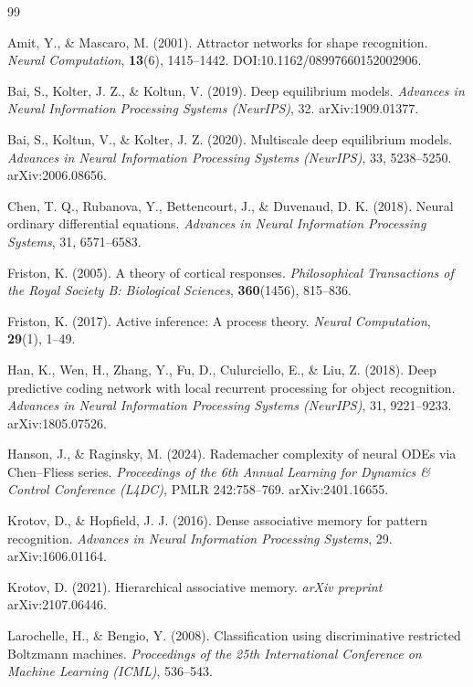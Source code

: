 \documentclass[11pt,a4paper]{article}
\begin{document}
\begin{thebibliography}{99}

Amit, Y., \& Mascaro, M. (2001).
Attractor networks for shape recognition.
\textit{Neural Computation}, \textbf{13}(6), 1415--1442.
DOI:10.1162/08997660152002906.

Bai, S., Kolter, J. Z., \& Koltun, V. (2019).
Deep equilibrium models.
\textit{Advances in Neural Information Processing Systems (NeurIPS)}, 32.
arXiv:1909.01377.

Bai, S., Koltun, V., \& Kolter, J. Z. (2020).
Multiscale deep equilibrium models.
\textit{Advances in Neural Information Processing Systems (NeurIPS)}, 33, 5238--5250.
arXiv:2006.08656.

Chen, T. Q., Rubanova, Y., Bettencourt, J., \& Duvenaud, D. K. (2018).
Neural ordinary differential equations.
\textit{Advances in Neural Information Processing Systems}, 31, 6571--6583.

Friston, K. (2005).
A theory of cortical responses.
\textit{Philosophical Transactions of the Royal Society B: Biological Sciences},
\textbf{360}(1456), 815--836.

Friston, K. (2017).
Active inference: A process theory.
\textit{Neural Computation}, \textbf{29}(1), 1--49.

Han, K., Wen, H., Zhang, Y., Fu, D., Culurciello, E., \& Liu, Z. (2018).
Deep predictive coding network with local recurrent processing for object recognition.
\textit{Advances in Neural Information Processing Systems (NeurIPS)}, 31, 9221--9233.
arXiv:1805.07526.

Hanson, J., \& Raginsky, M. (2024).
Rademacher complexity of neural ODEs via Chen--Fliess series.
\textit{Proceedings of the 6th Annual Learning for Dynamics \& Control Conference (L4DC)},
PMLR 242:758--769.
arXiv:2401.16655.

Krotov, D., \& Hopfield, J. J. (2016).
Dense associative memory for pattern recognition.
\textit{Advances in Neural Information Processing Systems}, 29.
arXiv:1606.01164.

Krotov, D. (2021).
Hierarchical associative memory.
\textit{arXiv preprint} arXiv:2107.06446.

Larochelle, H., \& Bengio, Y. (2008).
Classification using discriminative restricted Boltzmann machines.
\textit{Proceedings of the 25th International Conference on Machine Learning (ICML)},
536--543.


\end{thebibliography}
\end{document}
